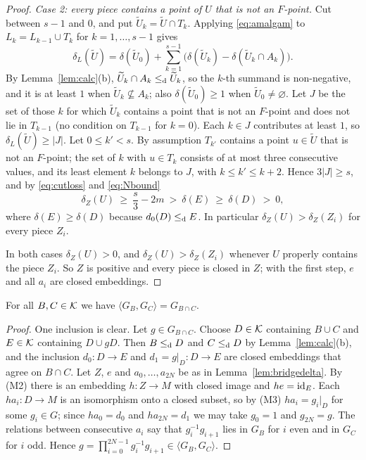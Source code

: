 \begin{proof}
\emph{Case 2: every piece contains a point of $U$ that is not an $F$-point.} Cut
between $s-1$ and $0$, and put $\widetilde U_k=\widetilde U\cap T_k$. Applying
\eqref{eq:amalgam} to $L_k=L_{k-1}\cup T_k$ for $k=1,\dots,s-1$ gives
\[
 \delta_L(\widetilde U)=\delta(\widetilde U_0)
 +\sum_{k=1}^{s-1}\bigl(\delta(\widetilde U_k)-\delta(\widetilde U_k\cap A_k)\bigr).
\]
By Lemma~\ref{lem:calc}(b), $\widetilde U_k\cap A_k\leq_{\mathrm{d}}\widetilde U_k$, so the
$k$-th summand is non-negative, and it is at least $1$ when
$\widetilde U_k\not\subseteq A_k$; also $\delta(\widetilde U_0)\ge 1$ when
$\widetilde U_0\ne\varnothing$. Let $J$ be the set of those $k$ for which
$\widetilde U_k$ contains a point that is not an $F$-point and does not lie in
$T_{k-1}$ (no condition on $T_{k-1}$ for $k=0$). Each $k\in J$ contributes at
least $1$, so $\delta_L(\widetilde U)\ge|J|$. Let $0\le k'<s$. By assumption
$T_{k'}$ contains a point $u\in\widetilde U$ that is not an $F$-point; the set
of $k$ with $u\in T_k$ consists of at most three consecutive values, and its
least element $k$ belongs to $J$, with $k\le k'\le k+2$. Hence $3|J|\ge s$, and
by \eqref{eq:cutloss} and \eqref{eq:Nbound}
\[
 \delta_Z(U)\ \ge\ \frac s3-2m\ >\ \delta(E)\ \ge\ \delta(D)\ >\ 0 ,
\]
where $\delta(E)\ge\delta(D)$ because $d_0(D)\leq_{\mathrm{d}} E$. In particular
$\delta_Z(U)>\delta_Z(Z_i)$ for every piece $Z_i$.

In both cases $\delta_Z(U)>0$, and $\delta_Z(U)>\delta_Z(Z_i)$ whenever $U$
properly contains the piece $Z_i$. So $Z$ is positive and every piece is closed
in $Z$; with the first step, $e$ and all $a_i$ are closed embeddings.
\end{proof}

\begin{proposition}\label{prop:stabdelta}
For all $B,C\in\mathcal{K}$ we have $\langle G_B,G_C\rangle=G_{B\cap C}$.
\end{proposition}

\begin{proof}
One inclusion is clear. Let $g\in G_{B\cap C}$. Choose $D\in\mathcal{K}$ containing
$B\cup C$ and $E\in\mathcal{K}$ containing $D\cup gD$. Then $B\leq_{\mathrm{d}} D$ and $C\leq_{\mathrm{d}} D$ by
Lemma~\ref{lem:calc}(b), and the inclusion $d_0\colon D\to E$ and
$d_1=g|_D\colon D\to E$ are closed embeddings that agree on $B\cap C$. Let
$Z$, $e$ and $a_0,\dots,a_{2N}$ be as in Lemma~\ref{lem:bridgedelta}. By (M2)
there is an embedding $h\colon Z\to M$ with closed image and $he=\mathrm{id}_E$. Each
$ha_i\colon D\to M$ is an isomorphism onto a closed subset, so by (M3)
$ha_i=g_i|_D$ for some $g_i\in G$; since $ha_0=d_0$ and $ha_{2N}=d_1$ we may take
$g_0=1$ and $g_{2N}=g$. The relations between consecutive $a_i$ say that
$g_i^{-1}g_{i+1}$ lies in $G_B$ for $i$ even and in $G_C$ for $i$ odd. Hence
$g=\prod_{i=0}^{2N-1}g_i^{-1}g_{i+1}\in\langle G_B,G_C\rangle$.
\end{proof}

